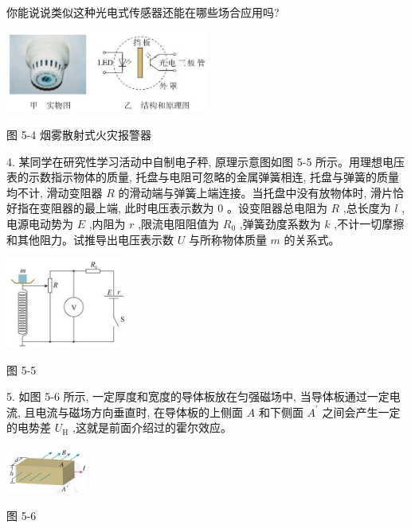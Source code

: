 \documentclass[10pt]{article}
\begin{document}
你能说说类似这种光电式传感器还能在哪些场合应用吗?

\begin{center}
\includegraphics[max width=0.5\textwidth]{images/01910e72-c5b7-7ed5-a6d4-fb3a5faefc32_114_598437.jpg}
\end{center}

图 5-4 烟雾散射式火灾报警器

4. 某同学在研究性学习活动中自制电子秤, 原理示意图如图 5-5 所示。用理想电压表的示数指示物体的质量, 托盘与电阻可忽略的金属弹簧相连, 托盘与弹簧的质量均不计, 滑动变阻器 \(R\) 的滑动端与弹簧上端连接。当托盘中没有放物体时, 滑片恰好指在变阻器的最上端, 此时电压表示数为 0 。设变阻器总电阻为 \(R\) ,总长度为 \(l\) ,电源电动势为 \(E\) ,内阻为 \(r\) ,限流电阻阻值为 \({R}_{0}\) ,弹簧劲度系数为 \(k\) ,不计一切摩擦和其他阻力。试推导出电压表示数 \(U\) 与所称物体质量 \(m\) 的关系式。

\begin{center}
\includegraphics[max width=0.3\textwidth]{images/01910e72-c5b7-7ed5-a6d4-fb3a5faefc32_115_980834.jpg}
\end{center}

图 5-5

5. 如图 5-6 所示, 一定厚度和宽度的导体板放在匀强磁场中, 当导体板通过一定电流, 且电流与磁场方向垂直时, 在导体板的上侧面 \(A\) 和下侧面 \({A}^{\prime }\) 之间会产生一定的电势差 \({U}_{\mathrm{H}}\) ,这就是前面介绍过的霍尔效应。

\begin{center}
\includegraphics[max width=0.2\textwidth]{images/01910e72-c5b7-7ed5-a6d4-fb3a5faefc32_115_807500.jpg}
\end{center}

图 5-6
\end{document}
